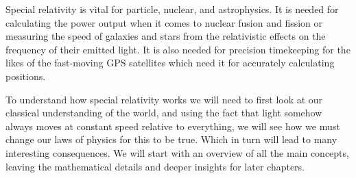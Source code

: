 Special relativity is vital for particle, nuclear, and astrophysics. It is needed for calculating the power output when it comes to nuclear fusion and fission or measuring the speed of galaxies and stars from the relativistic effects on the frequency of their emitted light. It is also needed for precision timekeeping for the likes of the fast-moving GPS satellites which need it for accurately calculating positions.

To understand how special relativity works we will need to first look at our classical understanding of the world, and using the fact that light somehow always moves at constant speed relative to everything, we will see how we must change our laws of physics for this to be true. Which in turn will lead to many interesting consequences. We will start with an overview of all the main concepts, leaving the mathematical details and deeper insights for later chapters.






